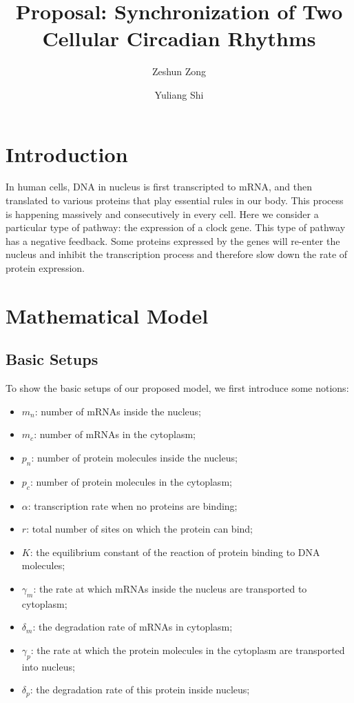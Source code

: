 \documentclass[12pt]{article}
\renewcommand{\(}{\left (}
\renewcommand{\)}{\right )}
\begin{document}
\title{Proposal: Synchronization of Two Cellular Circadian Rhythms}
\date{}
\author[1]{Zeshun Zong}
\author[2]{Yuliang Shi}

\maketitle


\section{Introduction}

\hspace{5mm} In human cells, DNA in nucleus is first transcripted to mRNA, and then translated to various proteins that play essential rules in our body. This process is happening massively and consecutively in every cell. Here we consider a particular type of pathway: the expression of a clock gene. This type of pathway has a negative feedback. Some proteins expressed by the genes will re-enter the nucleus and inhibit the transcription process and therefore slow down the rate of protein expression.

\section{Mathematical Model}

\subsection{Basic Setups}

\hspace{5mm} To show the basic setups of our proposed model, we first introduce some notions:
\begin{itemize}
  \item $m_n$: number of mRNAs inside the nucleus;
  \item $m_c$: number of mRNAs in the cytoplasm;
  \item $p_n$: number of protein molecules inside the nucleus;
  \item $p_c$: number of protein molecules in the cytoplasm;
  \item $\alpha$: transcription rate when no proteins are binding;
  \item $r$: total number of sites on which the protein can bind;
  \item $K$: the equilibrium constant of the reaction of protein binding to DNA molecules;
  \item $\gamma_m$: the rate at which mRNAs inside the nucleus are transported to cytoplasm;
  \item $\delta_m$: the degradation rate of mRNAs in cytoplasm;
  \item $\gamma_p$: the rate at which the protein molecules in the cytoplasm are transported into nucleus;
  \item $\delta_p$: the degradation rate of this protein inside nucleus;
\end{itemize}
\end{document}

